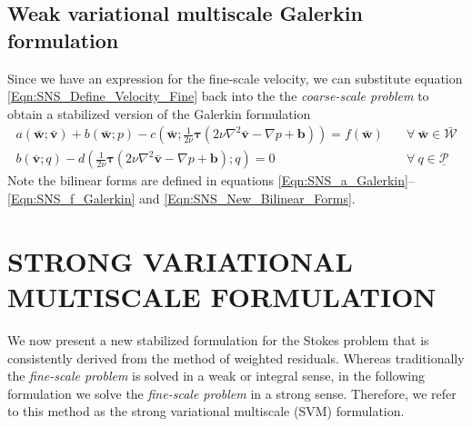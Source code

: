 \documentclass[11pt]{amsart}
\begin{document}
\subsection{Weak variational multiscale Galerkin formulation}
Since we have an expression for the fine-scale velocity, we can substitute equation \eqref{Eqn:SNS_Define_Velocity_Fine} back into the the \emph{coarse-scale problem} to obtain a stabilized version of the Galerkin formulation
\begin{align}
  \label{Eqn:SNS_Stabilized_Momentum}
  a(\bar{\boldsymbol{w}};\bar{\boldsymbol{v}}) + 
  b(\bar{\boldsymbol{w}};p) -
  c(\bar{\boldsymbol{w}} ;\frac{1}{2\nu}\boldsymbol{\tau}(2\nu \nabla^2 \bar{\boldsymbol{v}} - \nabla p + \boldsymbol{b})) = 
  f(\bar{\boldsymbol{w}}) & \quad \forall \ \bar{\boldsymbol{w}} \in \bar{\mathcal{W}} \\
\label{Eqn:SNS_stabilized_Continuity}
  b(\bar{\boldsymbol{v}};q) - d(\frac{1}{2\nu}\boldsymbol{\tau}(2\nu \nabla^2 \bar{\boldsymbol{v}} - \nabla p + \boldsymbol{b});q) = 0 & \quad \forall \ q \in \underline{\mathcal{P}}
\end{align}
Note the bilinear forms are defined in equations \eqref{Eqn:SNS_a_Galerkin}--\eqref{Eqn:SNS_f_Galerkin} and \eqref{Eqn:SNS_New_Bilinear_Forms}.



 \section{STRONG VARIATIONAL MULTISCALE FORMULATION}
We now present a new stabilized formulation for the Stokes problem that is consistently derived from the method of weighted residuals.  Whereas traditionally the \emph{fine-scale problem} is solved in a weak or integral sense, in the following formulation we solve the \emph{fine-scale problem} in a strong sense.  Therefore, we refer to this method as the strong variational multiscale (SVM) formulation.  
\end{document}
